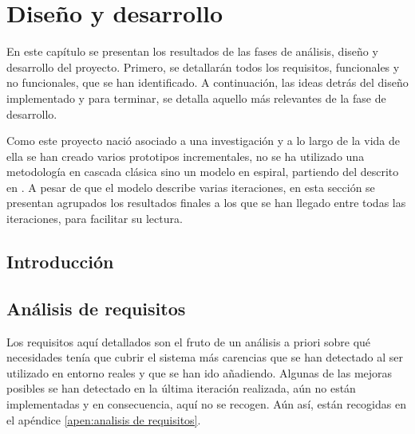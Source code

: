 \chapter{Diseño y desarrollo\label{sec:disenhoYDesarrollo}}


%

En este capítulo se presentan los resultados de las fases de análisis, diseño y desarrollo del proyecto. Primero, se detallarán todos los requisitos, funcionales y no funcionales, que se han identificado. A continuación, las ideas detrás del diseño implementado y para terminar, se detalla aquello más relevantes de la fase de desarrollo.

Como este proyecto nació asociado a una investigación y a lo largo de la vida de ella se han creado varios prototipos incrementales, no se ha utilizado una metodología en cascada clásica sino un modelo en espiral, partiendo del descrito en \cite{Boehm86}. A pesar de que el modelo describe varias iteraciones, en esta sección se presentan agrupados los resultados finales a los que se han llegado entre todas las iteraciones, para facilitar su lectura.


\section{Introducción}


\section{Análisis de requisitos}

Los requisitos aquí detallados son el fruto de un análisis a priori sobre qué necesidades tenía que cubrir el sistema más carencias que se han detectado al ser utilizado en entorno reales y que se han ido añadiendo. Algunas de las mejoras posibles se han detectado en la última iteración realizada, aún no están implementadas y en consecuencia, aquí no se recogen. Aún así, están recogidas en el apéndice \ref{apen:analisis de requisitos}. 

